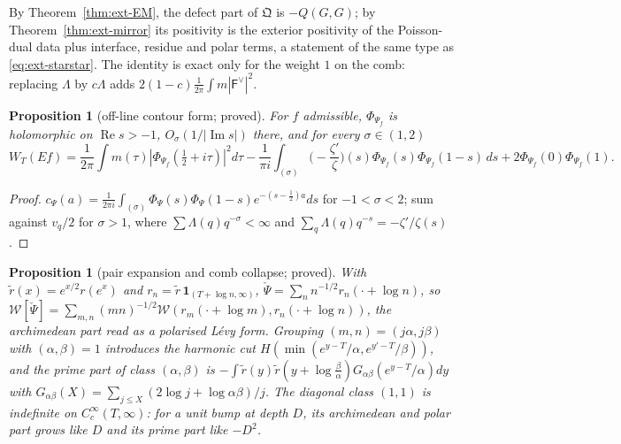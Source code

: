 \documentclass[11pt]{amsart}
\newtheorem{proposition}[theorem]{Proposition}
\theoremstyle{definition}
\theoremstyle{remark}
\newcommand{\Rel}{\operatorname{Re}}
\newcommand{\Iml}{\operatorname{Im}}
\begin{document}
By Theorem~\ref{thm:ext-EM}, the defect part of $\mathfrak Q$ is $-Q(G,G)$; by Theorem~\ref{thm:ext-mirror} its positivity is the
exterior positivity of the Poisson-dual data plus interface, residue and polar terms, a statement of the same type as
\eqref{eq:ext-starstar}. The identity is exact only for the weight $1$ on the comb: replacing $\Lambda$ by $c\Lambda$ adds
$2(1-c)\frac1{2\pi}\int m|\mathsf F^\vee|^2$.

\begin{proposition}[off-line contour form; proved]\label{prop:ext-contour}
For $f$ admissible, $\Phi_{\Psi_f}$ is holomorphic on $\Rel s>-1$, $O_\sigma(1/|\Iml s|)$ there, and for every $\sigma\in(1,2)$
\[
W_T(Ef)=\frac1{2\pi}\int m(\tau)|\Phi_{\Psi_f}(\tfrac12+i\tau)|^2d\tau-\frac1{\pi i}\int_{(\sigma)}\Big(-\frac{\zeta'}\zeta\Big)(s)
\Phi_{\Psi_f}(s)\Phi_{\Psi_f}(1-s)\,ds+2\Phi_{\Psi_f}(0)\Phi_{\Psi_f}(1).
\]
\end{proposition}
\begin{proof}
$c_{\Psi}(a)=\frac1{2\pi i}\int_{(\sigma)}\Phi_\Psi(s)\Phi_\Psi(1-s)e^{-(s-\frac12)a}ds$ for $-1<\sigma<2$; sum against $v_q/2$ for
$\sigma>1$, where $\sum\Lambda(q)q^{-\sigma}<\infty$ and $\sum_q\Lambda(q)q^{-s}=-\zeta'/\zeta(s)$.
\end{proof}

\begin{proposition}[pair expansion and comb collapse; proved]\label{prop:ext-pairs}
With $\tilde r(x)=e^{x/2}r(e^x)$ and $r_n=\tilde r\,\mathbf 1_{(T+\log n,\infty)}$, $\check\Psi=\sum_nn^{-1/2}r_n(\cdot+\log n)$, so
$\mathcal W[\check\Psi]=\sum_{m,n}(mn)^{-1/2}\mathcal W(r_m(\cdot+\log m),r_n(\cdot+\log n))$, the archimedean part read as a
polarised L\'evy form. Grouping $(m,n)=(j\alpha,j\beta)$ with $(\alpha,\beta)=1$ introduces the harmonic cut
$H(\min(e^{y-T}/\alpha,e^{y'-T}/\beta))$, and the prime part of class $(\alpha,\beta)$ is
$-\int\tilde r(y)\tilde r(y+\log\frac\beta\alpha)G_{\alpha\beta}(e^{y-T}/\alpha)dy$ with $G_{\alpha\beta}(X)=\sum_{j\le X}(2\log j+\log\alpha\beta)/j$.
The diagonal class $(1,1)$ is indefinite on $C_c^\infty(T,\infty)$: for a unit bump at depth $D$, its archimedean and polar part
grows like $D$ and its prime part like $-D^2$.
\end{proposition}
\end{document}
